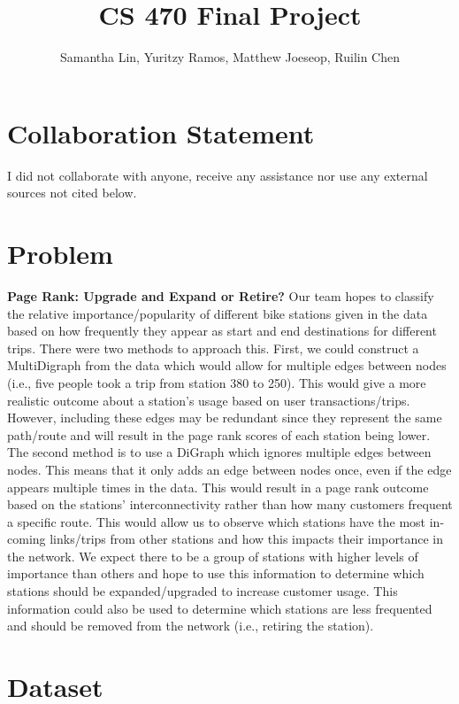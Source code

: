 \documentclass{article}
\title{CS 470 Final Project}
\author{Samantha Lin, Yuritzy Ramos, Matthew Joeseop, Ruilin Chen}
\begin{document}
\maketitle

\section{Collaboration Statement}
I did not collaborate with anyone, receive any assistance nor use any external sources not cited below.

\section{Problem}
\textbf{Page Rank: Upgrade and Expand or Retire?}
\newline 
Our team hopes to classify the relative importance/popularity of different bike stations given in the data based on how frequently they appear as start and end destinations for different trips. There were two methods to approach this. First, we could construct a MultiDigraph from the data which would allow for multiple edges between nodes (i.e., five people took a trip from station 380 to 250). This would give a more realistic outcome about a station's usage based on user transactions/trips. However, including these edges may be redundant since they represent the same path/route and will result in the page rank scores of each station being lower. The second method is to use a DiGraph which ignores multiple edges between nodes. This means that it only adds an edge between nodes once, even if the edge appears multiple times in the data. This would result in a page rank outcome based on the stations’  interconnectivity rather than how many customers frequent a specific route. This would allow us to observe which stations have the most in-coming links/trips from other stations and how this impacts their importance in the network. We expect there to be a group of stations with higher levels of importance than others and hope to use this information to determine which stations should be expanded/upgraded to increase customer usage. This information could also be used to determine which stations are less frequented and should be removed from the network (i.e., retiring the station).
\section{Dataset}
\end{document}
